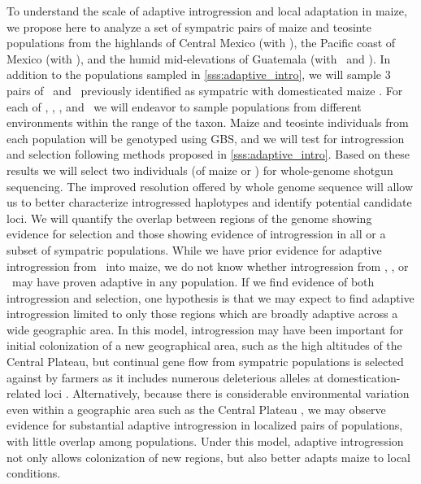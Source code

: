 To understand the scale of adaptive introgression and local adaptation in maize, we propose here to analyze a set of sympatric pairs of maize and teosinte populations from the highlands of Central Mexico (with \zm), the Pacific coast of Mexico (with \zp), and the humid mid-elevations of Guatemala (with \zl\ and \zh). 
In addition to the populations sampled in \ref{sss:adaptive_intro}, we will sample 3 pairs of \zm\ and \zp\ previously identified as sympatric with domesticated maize \citep{hufford2010genetic, Hufford2013}.  
For each of \zl, \zm, \zp, and \zh\ we will endeavor to sample populations from different environments within the range of the taxon.
Maize and teosinte individuals from each population will be genotyped using GBS, and we will test for introgression and selection following methods proposed in \ref{sss:adaptive_intro}.
Based on these results we will select two individuals (of maize or \zm) for whole-genome shotgun sequencing. 
The improved resolution offered by whole genome sequence will allow us to better characterize introgressed haplotypes and identify potential candidate loci.
We will quantify the overlap between regions of the genome showing evidence for selection and those showing evidence of introgression in all or a subset of sympatric populations.  
While we have prior evidence for adaptive introgression from \zm\ into maize, we do not know whether introgression from \zp, \zl, or \zh\ may have proven adaptive in any population.
If we find evidence of both introgression and selection, one hypothesis is that we may expect to find adaptive introgression limited to only those regions which are broadly adaptive across a wide geographic area. 
In this model, introgression may have been important for initial colonization of a new geographical area, such as the high altitudes of the Central Plateau, but continual gene flow from sympatric populations is selected against by farmers as it includes numerous deleterious alleles at domestication-related loci \citep[c.f.][]{Hufford2013}.
Alternatively, because there is considerable environmental variation even within a geographic area such as the Central Plateau \citep{hufford2012inferences, Pyhajarvi2013}, we may observe evidence for substantial adaptive introgression in localized pairs of populations, with little overlap among populations. 
Under this model, adaptive introgression not only allows colonization of new regions, but also better adapts maize to local conditions.

